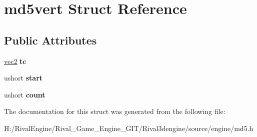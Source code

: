 \hypertarget{structmd5vert}{}\section{md5vert Struct Reference}
\label{structmd5vert}
\subsection*{Public Attributes}
\begin{DoxyCompactItemize}
\item 
\mbox{\label{structmd5vert_a43ef44ee5d64fa49e01bd5c033310e28}} 
\hyperlink{structvec2}{vec2} {\bfseries tc}
\item 
\mbox{\label{structmd5vert_acad6baf782ba1b58ca4108284f1b202a}} 
ushort {\bfseries start}
\item 
\mbox{\label{structmd5vert_a4aa72817985d27b5a38fa59d8460094b}} 
ushort {\bfseries count}
\end{DoxyCompactItemize}


The documentation for this struct was generated from the following file\+:\begin{DoxyCompactItemize}
\item 
H\+:/\+Rival\+Engine/\+Rival\+\_\+\+Game\+\_\+\+Engine\+\_\+\+G\+I\+T/\+Rival3dengine/source/engine/md5.\+h\end{DoxyCompactItemize}
